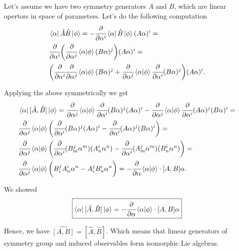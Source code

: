 \documentclass[main.tex]{subfiles}
\begin{document}
Let's assume we have two symmetry generators $A$ and $B$, which are linear opertors in space of parameters.
Let's do the following computation
\begin{align*}
& \bra{\alpha} \hat{A}\hat{B} \ket{\phi} = - \cfrac{\partial}{\partial \alpha^i}  
 \bra{\alpha} \hat{B} \ket{\phi} (A\alpha)^i = \\
&  \cfrac{\partial}{\partial \alpha^i} 
\bigg( \cfrac{\partial}{\partial \alpha^j} \bra{\alpha}\ket{\phi} (B\alpha)^j\bigg) (A\alpha)^i = \\
&  \bigg(\cfrac{\partial}{\partial \alpha^i} \cfrac{\partial}{\partial \alpha^j} \bra{\alpha}\ket{\phi} (B\alpha)^j + \cfrac{\partial}{\partial \alpha^j} \bra{\alpha}\ket{\phi} \cfrac{\partial}{\partial \alpha^i}(B\alpha)^j\bigg) (A\alpha)^i.
\end{align*}

Applying the above symmetrically we get
\begin{align*}
& \bra{\alpha} [\hat{A}, \hat{B}] \ket{\phi} = \cfrac{\partial}{\partial \alpha^j} \bra{\alpha}\ket{\phi} \cfrac{\partial}{\partial \alpha^i}(B\alpha)^j (A\alpha)^i 
- \cfrac{\partial}{\partial \alpha^j} \bra{\alpha}\ket{\phi} \cfrac{\partial}{\partial \alpha^i}(A\alpha)^j (B\alpha)^i = \\
& \cfrac{\partial}{\partial \alpha^j} \bra{\alpha}\ket{\phi}
\bigg(
 \cfrac{\partial}{\partial \alpha^i}(B\alpha)^j (A\alpha)^i 
- \cfrac{\partial}{\partial \alpha^i}(A\alpha)^j (B\alpha)^i
\bigg) = \\
& \cfrac{\partial}{\partial \alpha^j} \bra{\alpha}\ket{\phi}
\bigg(
 \cfrac{\partial}{\partial \alpha^i}(B^j_m\alpha^m) (A^i_n\alpha^n) 
- \cfrac{\partial}{\partial \alpha^i}(A^j_m \alpha^m) (B^i_n\alpha^n)
\bigg) = \\
& \cfrac{\partial}{\partial \alpha^j} \bra{\alpha}\ket{\phi}
\bigg(
 B^j_i A^i_n\alpha^n 
- A^j_iB^i_n\alpha^n
\bigg) = - \cfrac{\partial}{\partial \alpha} \bra{\alpha}\ket{\phi} \cdot [A, B]\alpha.
\end{align*}

We showed
\begin{equation}
\boxed{
\bra{\alpha} [\hat{A}, \hat{B}] \ket{\phi} = - \cfrac{\partial}{\partial \alpha} \bra{\alpha}\ket{\phi} \cdot [A, B]\alpha
}
\end{equation}

Hence, we have $\widehat{[A, B]} = [\hat{A}, \hat{B}]$. 
Which means that limear generators of symmetry group and induced observables form isomorphic Lie algebras.
\end{document}

